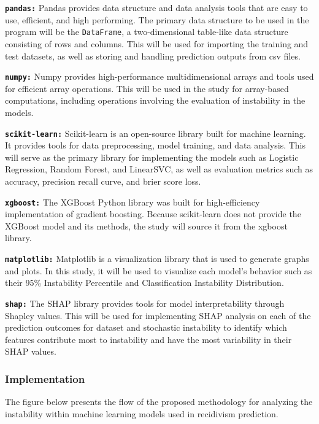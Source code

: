 \documentclass{article}
\begin{document}
\textbf{\texttt{pandas:}} Pandas provides data structure and data analysis tools that are easy to use, efficient, and high performing. The primary data structure to be used in the program will be the \texttt{DataFrame}, a two-dimensional table-like data structure consisting of rows and columns. This will be used for importing the training and test datasets, as well as storing and handling prediction outputs from csv files.

\textbf{\texttt{numpy:}} Numpy provides high-performance multidimensional arrays and tools used for efficient array operations. This will be used in the study for array-based computations, including operations involving the evaluation of instability in the models.

\textbf{\texttt{scikit-learn:}} Scikit-learn is an open-source library built for machine learning. It provides tools for data preprocessing, model training, and data analysis. This will serve as the primary library for implementing the models such as Logistic Regression, Random Forest, and LinearSVC, as well as evaluation metrics such as accuracy, precision recall curve, and brier score loss.

\textbf{\texttt{xgboost:}} The XGBoost Python library was built for high-efficiency implementation of gradient boosting. Because scikit-learn does not provide the XGBoost model and its methods, the study will source it from the xgboost library.

\textbf{\texttt{matplotlib:}} Matplotlib is a visualization library that is used to generate graphs and plots. In this study, it will be used to visualize each model's behavior such as their 95\% Instability Percentile and Classification Instability Distribution. 

\textbf{\texttt{shap:}} The SHAP library provides tools for model interpretability through Shapley values. This will be used for implementing SHAP analysis on each of the prediction outcomes for dataset and stochastic instability to identify which features contribute most to instability and have the most variability in their SHAP values.

\subsubsection{Implementation}
The figure below presents the flow of the proposed methodology for analyzing the instability within machine learning models used in recidivism prediction. 
\end{document}
